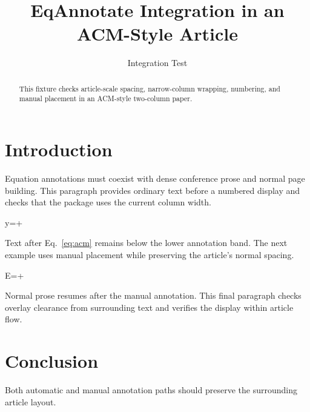 \documentclass[sigconf,nonacm]{acmart}
\title{EqAnnotate Integration in an ACM-Style Article}
\author{Integration Test}
\affiliation{\institution{Synthetic Validation Fixture}\country{Nowhere}}
\begin{document}
\begin{abstract}
This fixture checks article-scale spacing, narrow-column wrapping, numbering, and manual placement in an ACM-style two-column paper.
\end{abstract}
\maketitle
\section{Introduction}
Equation annotations must coexist with dense conference prose and normal page building. This paragraph provides ordinary text before a numbered display and checks that the package uses the current column width.
\begin{annotatedequation}[numbered]
y=+
\label{eq:acm}
\end{annotatedequation}
Text after Eq.~\eqref{eq:acm} remains below the lower annotation band. The next example uses manual placement while preserving the article's normal spacing.
\begin{annotatedequation}
E=+
\end{annotatedequation}
Normal prose resumes after the manual annotation. This final paragraph checks overlay clearance from surrounding text and verifies the display within article flow.
\section{Conclusion}
Both automatic and manual annotation paths should preserve the surrounding article layout.
\end{document}
